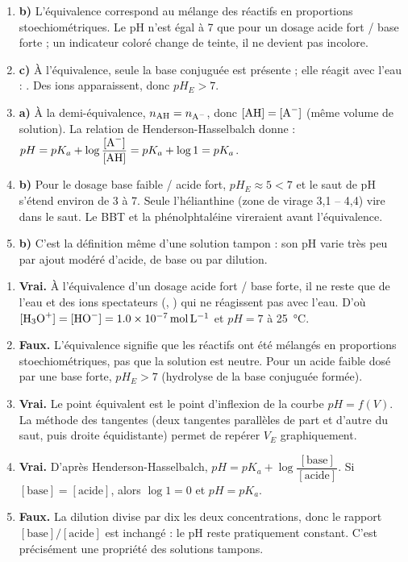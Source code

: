 \documentclass[11pt]{article}
\begin{document}
\begin{corrige}
\begin{enumerate}
\item \textbf{b)} L'équivalence correspond au mélange des réactifs en proportions stoechiométriques. Le pH n'est égal à 7 que pour un dosage acide fort / base forte ; un indicateur coloré change de teinte, il ne devient pas incolore.
\item \textbf{c)} À l'équivalence, seule la base conjuguée  est présente ; elle réagit avec l'eau : . Des ions  apparaissent, donc $pH_E > 7$.
\item \textbf{a)} À la demi-équivalence, $n_{\ce{AH}} = n_{\ce{A-}}$, donc $[\ce{AH}] = [\ce{A-}]$ (même volume de solution). La relation de Henderson-Hasselbalch donne : $pH = pK_a + \log\dfrac{[\ce{A-}]}{[\ce{AH}]} = pK_a + \log 1 = pK_a$.
\item \textbf{b)} Pour le dosage base faible / acide fort, $pH_E \approx 5 < 7$ et le saut de pH s'étend environ de 3 à 7. Seule l'hélianthine (zone de virage 3,1 -- 4,4) vire dans le saut. Le BBT et la phénolphtaléine vireraient avant l'équivalence.
\item \textbf{b)} C'est la définition même d'une solution tampon : son pH varie très peu par ajout modéré d'acide, de base ou par dilution.
\end{enumerate}
\end{corrige}

\begin{corrige}
\begin{enumerate}
\item \textbf{Vrai.} À l'équivalence d'un dosage acide fort / base forte, il ne reste que de l'eau et des ions spectateurs (, ) qui ne réagissent pas avec l'eau. D'où $[\ce{H3O+}] = [\ce{HO-}] = \SI{1,0e-7}{mol.L^{-1}}$ et $pH = 7$ à \SI{25}{\celsius}.
\item \textbf{Faux.} L'équivalence signifie que les réactifs ont été mélangés en proportions stoechiométriques, pas que la solution est neutre. Pour un acide faible dosé par une base forte, $pH_E > 7$ (hydrolyse de la base conjuguée formée).
\item \textbf{Vrai.} Le point équivalent est le point d'inflexion de la courbe $pH = f(V)$. La méthode des tangentes (deux tangentes parallèles de part et d'autre du saut, puis droite équidistante) permet de repérer $V_E$ graphiquement.
\item \textbf{Vrai.} D'après Henderson-Hasselbalch, $pH = pK_a + \log\dfrac{[\text{base}]}{[\text{acide}]}$. Si $[\text{base}] = [\text{acide}]$, alors $\log 1 = 0$ et $pH = pK_a$.
\item \textbf{Faux.} La dilution divise par dix les deux concentrations, donc le rapport $[\text{base}]/[\text{acide}]$ est inchangé : le pH reste pratiquement constant. C'est précisément une propriété des solutions tampons.
\end{enumerate}
\end{corrige}
\end{document}
